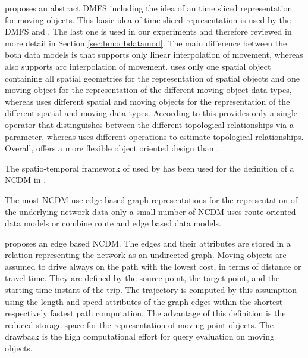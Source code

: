 \documentclass[a4paper]{article}
\begin{document}
\cite{RepresentingMovingObjectsGueting} proposes an abstract DMFS including the
idea of an time sliced representation for moving objects. This basic idea of
time sliced representation is used by the DMFS \cite{STAUPelekis} and
\cite{DataModelDataStructureGueting}. The last one is used in our experiments
and therefore reviewed in more detail in Section \ref{sec:bmodbdatamod}.
The main difference between the both data models is that
\cite{DataModelDataStructureGueting} supports only linear interpolation of movement,
whereas \cite{STAUPelekis} also supports arc interpolation of movement.
\cite{STAUPelekis} uses only one spatial object
containing all spatial geometries for the representation of spatial objects and
one moving object for the representation of the different moving object data types,
whereas \cite{DataModelDataStructureGueting} uses different spatial and moving
objects for the representation of the different spatial and moving data types.
According to this \cite{STAUPelekis} provides only a single operator that 
distinguishes
between the different topological relationships via a parameter, whereas
\cite{DataModelDataStructureGueting} uses different operations to estimate
topological relationships. Overall, \cite{STAUPelekis} offers a more flexible
object oriented design than \cite{DataModelDataStructureGueting}.

The spatio-temporal framework of \cite{RepresentingMovingObjectsGueting} used by
\cite{DataModelDataStructureGueting} has been used for the definition of a
NCDM in \cite{NetworkGueting}.

The most NCDM use edge based graph representations for the representation of the
underlying network data only a small number of NCDM uses route oriented data models
or combine route and edge based data models.

\cite{NetworkVazirgiannis} proposes an edge based NCDM. The edges and their 
attributes
are stored in a relation representing the network as an undirected graph. Moving
objects are assumed to drive always on the path with the lowest cost,
in terms of distance or travel-time. They are defined by the source point, the
target point, and the starting time instant of the trip. The trajectory is
computed by this assumption using the length and speed attributes of the graph
edges within the shortest respectively fastest path computation.
The advantage of this definition is the reduced storage space for the representation
of moving point objects. The drawback is the high computational effort for query
evaluation on moving objects.
\end{document}
